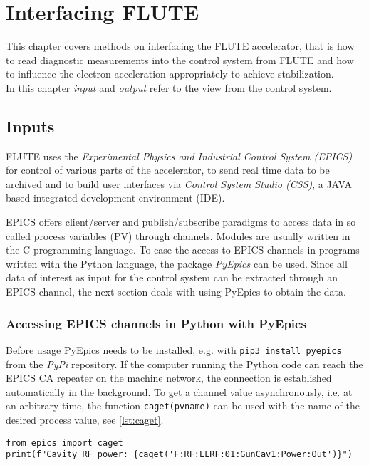 \chapter{Interfacing FLUTE}
This chapter covers methods on interfacing the FLUTE accelerator, that is how to read diagnostic measurements into the control system from FLUTE and how to influence the electron acceleration appropriately to achieve stabilization.\\
In this chapter \textit{input} and \textit{output} refer to the view from the control system.

\section{Inputs}
FLUTE uses the \textit{Experimental Physics and Industrial Control System (EPICS)}\cite{Dalesio1991} for control of various parts of the accelerator, to send real time data to be archived and to build user interfaces via \textit{Control System Studio (CSS)}\cite{CSS2021}, a JAVA based integrated development environment (IDE).

EPICS offers client/server and publish/subscribe paradigms to access data in so called process variables (PV) through channels. Modules are usually written in the C programming language. To ease the access to EPICS channels in programs written with the Python language, the package \textit{PyEpics}\cite{Newville2019} can be used. Since all data of interest as input for the control system can be extracted through an EPICS channel, the next section deals with using PyEpics to obtain the data.

\subsection{Accessing EPICS channels in Python with PyEpics}
Before usage PyEpics needs to be installed, e.g. with \texttt{pip3 install pyepics} from the \textit{PyPi} repository. If the computer running the Python code can reach the EPICS CA repeater on the machine network, the connection is established automatically in the background. To get a channel value asynchronously, i.e. at an arbitrary time, the function \texttt{caget(pvname)} can be used with the name of the desired process value, see \autoref{lst:caget}.

\begin{lstlisting}[style=python,caption = Using \texttt{caget()} to get the value of an EPICS process value, label = lst:lst-caget]
from epics import caget
print(f"Cavity RF power: {caget('F:RF:LLRF:01:GunCav1:Power:Out')}")
\end{lstlisting}

